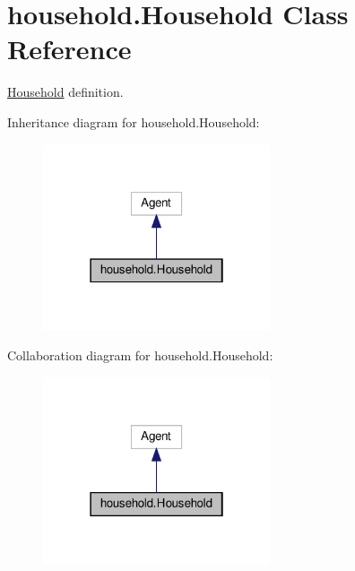 \hypertarget{classhousehold_1_1Household}{}\section{household.\+Household Class Reference}
\label{classhousehold_1_1Household}


\hyperlink{classhousehold_1_1Household}{Household} definition.  




Inheritance diagram for household.\+Household\+:\nopagebreak
\begin{figure}[H]
\begin{center}
\leavevmode
\includegraphics[width=190pt]{classhousehold_1_1Household__inherit__graph}
\end{center}
\end{figure}


Collaboration diagram for household.\+Household\+:\nopagebreak
\begin{figure}[H]
\begin{center}
\leavevmode
\includegraphics[width=190pt]{classhousehold_1_1Household__coll__graph}
\end{center}
\end{figure}
